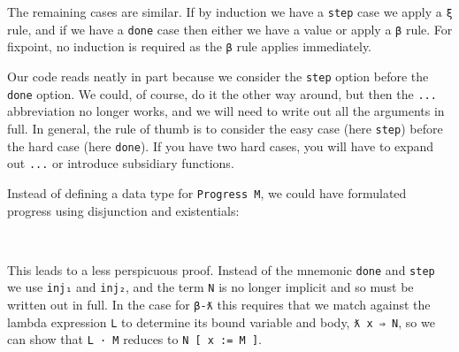 The remaining cases are similar. If by induction we have a \texttt{step}
case we apply a \texttt{ξ} rule, and if we have a \texttt{done} case
then either we have a value or apply a \texttt{β} rule. For fixpoint, no
induction is required as the \texttt{β} rule applies immediately.

Our code reads neatly in part because we consider the \texttt{step}
option before the \texttt{done} option. We could, of course, do it the
other way around, but then the \texttt{...} abbreviation no longer
works, and we will need to write out all the arguments in full. In
general, the rule of thumb is to consider the easy case (here
\texttt{step}) before the hard case (here \texttt{done}). If you have
two hard cases, you will have to expand out \texttt{...} or introduce
subsidiary functions.

Instead of defining a data type for \texttt{Progress\ M}, we could have
formulated progress using disjunction and existentials:

\begin{fence}
\begin{code}%
\>[0]\<%
\\
\>[0][@{}l@{\AgdaIndent{0}}]%
\>[2]\AgdaSpace{}%
\AgdaSymbol{:}\AgdaSpace{}%
\AgdaSpace{}%
\AgdaSpace{}%
\AgdaSymbol{\{}\AgdaSymbol{\}}\AgdaSpace{}%
\AgdaSpace{}%
\AgdaSpace{}%
\AgdaSpace{}%
\AgdaSpace{}%
\AgdaSpace{}%
\AgdaSpace{}%
\AgdaSpace{}%
\AgdaSpace{}%
\AgdaSpace{}%
\AgdaSpace{}%
\AgdaFunction{∃[}\AgdaSpace{}%
\AgdaSpace{}%
\AgdaFunction{]}\AgdaSymbol{(}\AgdaSpace{}%
\AgdaSpace{}%
\AgdaSymbol{)}\<%
\end{code}
\end{fence}

This leads to a less perspicuous proof. Instead of the mnemonic
\texttt{done} and \texttt{step} we use \texttt{inj₁} and \texttt{inj₂},
and the term \texttt{N} is no longer implicit and so must be written out
in full. In the case for \texttt{β-ƛ} this requires that we match
against the lambda expression \texttt{L} to determine its bound variable
and body, \texttt{ƛ\ x\ ⇒\ N}, so we can show that \texttt{L\ ·\ M}
reduces to \texttt{N\ {[}\ x\ :=\ M\ {]}}.

